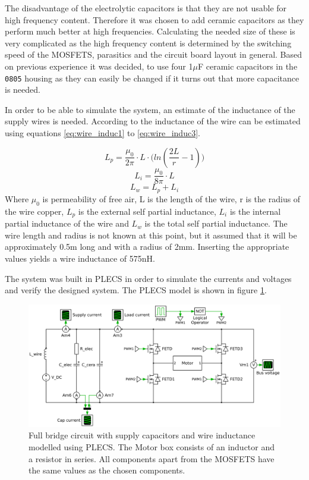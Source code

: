 The disadvantage of the electrolytic capacitors is that they are not usable for high frequency content.
Therefore it was chosen to add ceramic capacitors as they perform much better at high frequencies. 
Calculating the needed size of these is very complicated as the high frequency content is determined by the switching speed of the MOSFETS, parasitics and the circuit board layout in general. 
Based on previous experience it was decided, to use four 1$\mu$F ceramic capacitors in the \texttt{0805} housing as they can easily be changed if it turns out that more capacitance is needed.

In order to be able to simulate the system, an estimate of the inductance of the supply wires is needed.
According to \cite{partial_induc} the inductance of the wire can be estimated using equations \ref{eq:wire_induc1} to \ref{eq:wire_induc3}.

\begin{equation}
	L_p = \frac{\mu_0}{2 \pi} \cdot L \cdot \big(ln(\frac{2L}{r}-1)\big)
	\label{eq:wire_induc1}
\end{equation}
\begin{equation}
	L_i = \frac{\mu_0}{8 \pi} \cdot L
\end{equation}
\begin{equation}
	L_w = L_p + L_i
	\label{eq:wire_induc3}
\end{equation}
Where $\mu_0$ is permeability of free air, L is the length of the wire, r is the radius of the wire copper, $L_p$ is the external self partial inductance, $L_i$ is the internal partial inductance of the wire and $L_w$ is the total self partial inductance.
The wire length and radius is not known at this point, but it assumed that it will be approximately 0.5m long and with a radius of 2mm. 
Inserting the appropriate values yields a wire inductance of 575nH.

The system was built in PLECS in order to simulate the currents and voltages and verify the designed system.
The PLECS model is shown in figure \ref{fig:plecs_schem}.

\begin{figure}[h]
	\centering
	\includegraphics[width=1\linewidth]{graphics/plecs_schem.png}
	\caption{Full bridge circuit with supply capacitors and wire inductance modelled using PLECS. The Motor box consists of an inductor and a resistor in series. All components apart from the MOSFETS have the same values as the chosen components.}
	\label{fig:plecs_schem}
\end{figure}	

